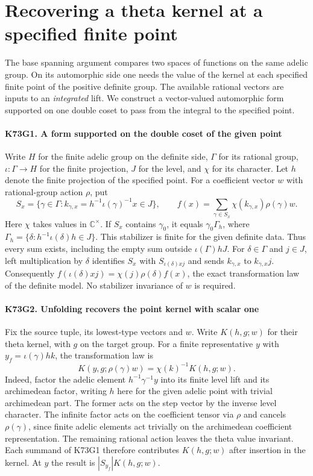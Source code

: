 \section*{Recovering a theta kernel at a specified finite point}

The base spanning argument compares two spaces of functions on the same
adelic group. On its automorphic side one needs the value of the kernel
at each specified finite point of the positive definite group. The
available rational vectors are inputs to an \emph{integrated} lift.
We construct a vector-valued automorphic form supported on one double
coset to pass from the integral to the specified point.

\paragraph{K73G1. A form supported on the double coset of the given point}
Write $H$ for the finite adelic group on the definite side, $\Gamma$ for
its rational group, $\iota:\Gamma\to H$ for the finite projection,
$J$ for the level, and $\chi$ for its character. Let $h$ denote the
finite projection of the specified point. For a coefficient vector $w$
with rational-group action $\rho$, put
\[
 S_x=\{\gamma\in\Gamma : k_{\gamma,x}
       = h^{-1}\iota(\gamma)^{-1}x\in J\},\qquad
 f(x)=\sum_{\gamma\in S_x}\chi(k_{\gamma,x})\rho(\gamma) w .
\]
Here $\chi$ takes values in $\mathbb C^\times$. If $S_x$ contains
$\gamma_0$, it equals $\gamma_0\Gamma_h$, where
$\Gamma_h=\{\delta:h^{-1}\iota(\delta)h\in J\}$. This stabilizer is finite
for the given definite data. Thus every sum exists, including the empty
sum outside $\iota(\Gamma)hJ$. For $\delta\in\Gamma$ and $j\in J$,
left multiplication by $\delta$ identifies $S_x$ with
$S_{\iota(\delta)xj}$ and sends $k_{\gamma,x}$ to $k_{\gamma,x}j$.
Consequently $f(\iota(\delta)xj)=\chi(j)\rho(\delta)f(x)$, the exact
transformation law of the definite model. No stabilizer invariance of
$w$ is required.

\paragraph{K73G2. Unfolding recovers the point kernel with scalar one}
Fix the source tuple, its lowest-type vectors and $w$. Write
$K(h,g;w)$ for their theta kernel, with $g$ on the target group.
For a finite representative $y$ with $y_f=\iota(\gamma)h k$,
the transformation law is
\[
 K(y,g;\rho(\gamma)w)=\chi(k)^{-1}K(h,g;w).
\]
Indeed, factor the adelic element $h^{-1}\gamma^{-1}y$ into its finite
level lift and its archimedean factor, writing $h$ here for the given
adelic point with trivial archimedean part. The former acts on the
step vector by the inverse level character. The infinite factor acts
on the coefficient tensor via $\rho$ and cancels $\rho(\gamma)$,
since finite adelic elements act trivially on the archimedean
coefficient representation. The remaining rational action leaves the
theta value invariant. Each summand of K73G1 therefore contributes
$K(h,g;w)$ after insertion in the kernel. At $y$ the result is
$|S_{y_f}|K(h,g;w)$.

